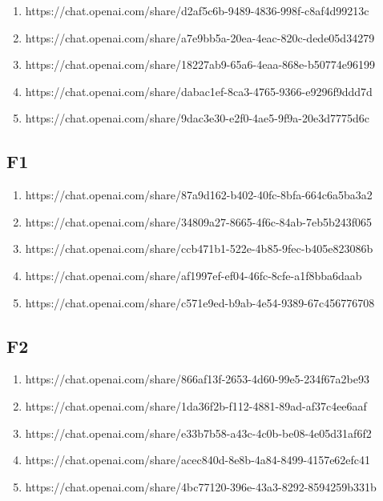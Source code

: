 \begin{enumerate}
    \item https://chat.openai.com/share/d2af5c6b-9489-4836-998f-c8af4d99213c
    \item https://chat.openai.com/share/a7e9bb5a-20ea-4eac-820c-dede05d34279
    \item https://chat.openai.com/share/18227ab9-65a6-4eaa-868e-b50774e96199
    \item https://chat.openai.com/share/dabac1ef-8ca3-4765-9366-e9296f9ddd7d
    \item https://chat.openai.com/share/9dac3e30-e2f0-4ae5-9f9a-20e3d7775d6c
\end{enumerate}

\subsection{F1}

\begin{enumerate}
    \item https://chat.openai.com/share/87a9d162-b402-40fc-8bfa-664c6a5ba3a2
    \item https://chat.openai.com/share/34809a27-8665-4f6c-84ab-7eb5b243f065
    \item https://chat.openai.com/share/ccb471b1-522e-4b85-9fec-b405e823086b
    \item https://chat.openai.com/share/af1997ef-ef04-46fc-8cfe-a1f8bba6daab
    \item https://chat.openai.com/share/c571e9ed-b9ab-4e54-9389-67c456776708
\end{enumerate}

\subsection{F2}

\begin{enumerate}
    \item https://chat.openai.com/share/866af13f-2653-4d60-99e5-234f67a2be93
    \item https://chat.openai.com/share/1da36f2b-f112-4881-89ad-af37c4ee6aaf
    \item https://chat.openai.com/share/e33b7b58-a43c-4c0b-be08-4e05d31af6f2
    \item https://chat.openai.com/share/acec840d-8e8b-4a84-8499-4157e62efc41
    \item https://chat.openai.com/share/4bc77120-396e-43a3-8292-8594259b331b
\end{enumerate}


